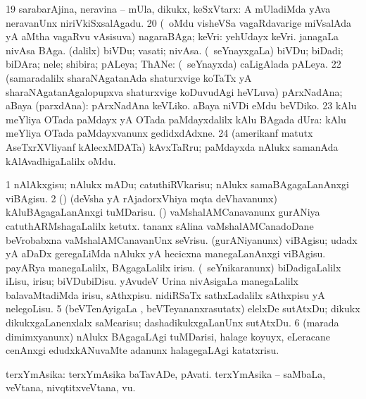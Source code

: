 \eanum
\numie
\num{19} sarabarAjina, neravina -- mUla, dikukx, keSxVtarx:   A mUladiMda yAva neravanUnx niriVkiSxsalAgadu. 
\num{20} (\kanmu\ oMdu visheVSa vagaRdavarige miVsalAda yA aMtha vagaRvu vAsisuva) nagaraBAga; keVri:   yehUdayx keVri.   janagaLa nivAsa BAga. 
 (\bava dalilx) 
\banum
{} biVDu; vasati; nivAsa. 
 (\kanmu\ seYnayxgaLa) biVDu; biDadi; biDAra; nele; shibira; pALeya; ThANe:  (\kanmu\ seYnayxda) caLigAlada pALeya. 
\eanum
\numie
\num{22} (samaradalilx sharaNAgatanAda shaturxvige koTaTx yA sharaNAgatanAgalopupxva shaturxvige koDuvudAgi heVLuva) pArxNadAna; aBaya (parxdAna):   pArxNadAna keVLiko.   aBaya niVDi eMdu beVDiko. 
\num{23} kAlu meYliya OTada paMdayx yA OTada paMdayxdalilx kAlu BAgada dUra:   kAlu meYliya OTada paMdayxvanunx gedidxdAdxne. 
\num{24} (amerikanf matutx AseTxrXVliyanf kAlecxMDATa) kAvxTaRru; paMdayxda nAlukx samanAda kAlAvadhigaLalilx oMdu. 
\enum
\emng
\eentry

\bentry
{}
\gl{\sakirx}
\bmng
\bnum
\num{1} nAlAkxgisu; nAlukx mADu; catuthiRVkarisu; nAlukx samaBAgagaLanAnxgi viBAgisu. 
\num{2} (\ca) (deVsha yA rAjadorxVhiya mqta deVhavanunx) kAluBAgagaLanAnxgi tuMDarisu. 
 (\vaMlAM) 
\banum
{} vaMshalAMCanavanunx gurANiya catuthARMshagaLalilx ketutx. 
 tananx sAlina vaMshalAMCanadoDane beVrobabxna vaMshalAMCanavanUnx seVrisu. 
 (gurANiyanunx) viBAgisu; udadx yA aDaDx geregaLiMda nAlukx yA hecicxna manegaLanAnxgi viBAgisu. 
 payARya manegaLalilx, BAgagaLalilx irisu. 
\eanum
\numie
{} (\kanmu\ seYnikaranunx) 
\banum
{} biDadigaLalilx iLisu, irisu; biVDubiDisu. 
 yAvudeV Urina nivAsigaLa manegaLalilx balavaMtadiMda irisu, sAthxpisu. 
 nidiRSaTx sathxLadalilx sAthxpisu yA nelegoLisu. 
\eanum
\numie
\num{5} (beVTenAyigaLa \vi, beVTeyananxrasutatx) elelxDe sutAtxDu; dikukx dikukxgaLanenxlalx saMcarisu; dashadikukxgaLanUnx sutAtxDu. 
\num{6} (marada dimimxyanunx) nAlukx BAgagaLAgi tuMDarisi, halage koyuyx, eLeracane cenAnxgi edudxkANuvaMte adanunx halagegaLAgi katatxrisu. 
\enum
\emng
\eentry

\bentry
{}
\gl{\nA}
\bmng
terxYmAsika: 
\banum
{} terxYmAsika baTavADe, pAvati. 
 terxYmAsika -- saMbaLa, veVtana, nivqtitxveVtana, \mo vu. 
\eanum
\emng
\eentry

